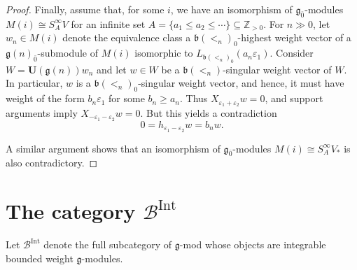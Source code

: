 \documentclass[12pt]{amsart}
\newcommand\Z{\mathbb{Z}}
\newcommand\g{\mathfrak{g}}
\newcommand\fb{\mathfrak{b}}
\newcommand\cB{\mathcal{B}}
\newcommand\bU{\mathbf{U}}
\DeclareMathOperator{\Int}{Int}
\theoremstyle{plain}
\theoremstyle{definition}
\numberwithin{equation}{section}
\begin{document}
\begin{proof}
Finally, assume that, for some $i$, we have an isomorphism of $\g_{\bar 0}$-modules $M(i)\cong S^\infty_A V$ for an infinite set $A = \{a_1\leq a_2\leq \cdots\}\subseteq \Z_{>0}$. For $n\gg 0$, let $w_n\in M(i)$ denote the equivalence class a $\fb(<_n)_0$-highest weight vector of a $\g(n)_{\bar 0}$-submodule of $M(i)$ isomorphic to $L_{\fb(<_n)_0}(a_n\varepsilon_1 )$. Consider $W = \bU(\g(n))w_n$ and let $w\in W$ be a $\fb(<_n)$-singular weight vector of $W$. In particular, $w$ is a $\fb(<_n)_0$-singular weight vector, and hence, it must have weight of the form $b_n\varepsilon_1$ for some $b_n\geq a_n$. Thus $X_{\varepsilon_1 + \varepsilon_2}w = 0$, and support arguments imply $X_{-\varepsilon_1 - \varepsilon_2}w = 0$. But this yields a contradiction
	\[
0=h_{\varepsilon_1 - \varepsilon_2}w = b_n w.
	\]

A similar argument shows that an isomorphism of $\g_{\bar 0}$-modules $M(i)\cong S^\infty_A V_*$ is also contradictory.
\end{proof}

\section{The category $\cB^{\Int}$}\label{sec:blocks}
Let $\cB^{\Int}$ denote the full subcategory of $\g$-mod whose objects are integrable bounded weight $\g$-modules. 
\end{document}
